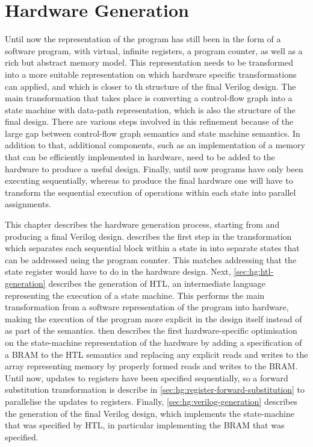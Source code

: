 \chapter{Hardware Generation}

Until now the representation of the program has still been in the form of a
software program, with virtual, infinite registers, a program counter, as well
as a rich but abstract memory model.  This representation needs to be
transformed into a more suitable representation on which hardware specific
transformations can applied, and which is closer to th structure of the final
Verilog design.  The main transformation that takes place is converting a
control-flow graph into a state machine with data-path representation, which is
also the structure of the final design.  There are various steps involved in
this refinement because of the large gap between control-flow graph semantics
and state machine semantics.  In addition to that, additional components, such
as an implementation of a memory that can be efficiently implemented in
hardware, need to be added to the hardware to produce a useful design.  Finally,
until now programs have only been executing sequentially, whereas to produce the
final hardware one will have to transform the sequential execution of operations
within each state into parallel assignments.

This chapter describes the hardware generation process, starting from \rtlpar{}
and producing a final Verilog design.  
describes the first step in the transformation which separates each sequential
block within a state in \rtlpar{} into separate states that can be addressed
using the program counter.  This matches addressing that the state register
would have to do in the hardware design. Next, \cref{sec:hg:htl-generation}
describes the generation of HTL, an intermediate language representing the
execution of a state machine.  This performs the main transformation from a
software representation of the program into hardware, making the execution of
the program more explicit in the design itself instead of as part of the
semantics.   then describes the first
hardware-specific optimisation on the state-machine representation of the
hardware by adding a specification of a \gls{BRAM} to the HTL semantics and
replacing any explicit reads and writes to the array representing memory by
properly formed reads and writes to the \gls{BRAM}.  Until now, updates to
registers have been specified sequentially, so a forward substitution
transformation is describe in \cref{sec:hg:register-forward-substitution} to
parallelise the updates to registers.  Finally, \cref{sec:hg:verilog-generation}
describes the generation of the final Verilog design, which implements the
state-machine that was specified by HTL, in particular implementing the
\gls{BRAM} that was specified.

